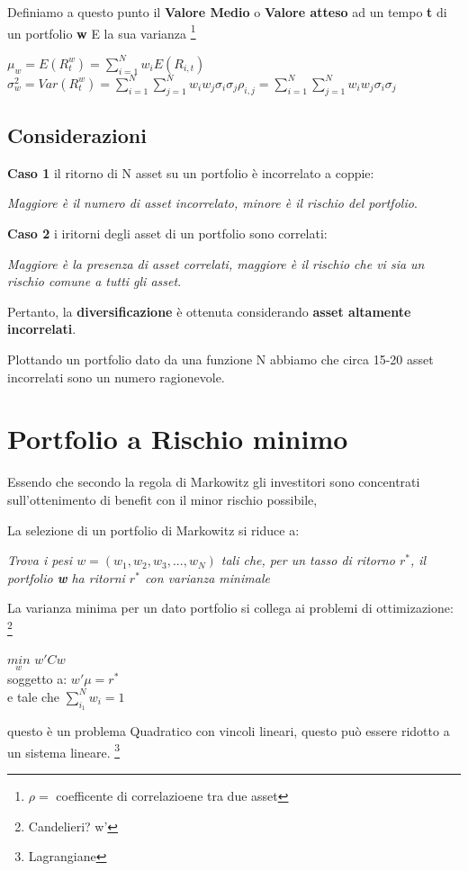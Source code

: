 \documentclass[a4paper,11pt]{report}
\begin{document}
{	Definiamo a questo punto il \textbf{Valore Medio} o \textbf{Valore atteso} ad un tempo \textbf{t} di un portfolio \textbf{w} E la sua varianza \footnote{ $\rho =$ coefficente di correlazioene tra due asset}
\begin{center}
	$\mu_w = E(R_t^w) =  \sum\limits_{i=1}^N w_i E(R_{i,t}) $ 
	$\sigma_w^2 = Var(R_t^w) =  \sum\limits_{i=1}^N  \sum\limits_{j=1}^N w_i w_j \sigma_i \sigma_j \rho_{i,j} =  \sum		\limits_{i=1}^N  \sum\limits_{j=1}^N w_i w_j \sigma_i \sigma_j  $ 
\end{center}
\subsection{Considerazioni}
	\textbf{Caso 1} il ritorno di N asset su un portfolio è incorrelato a coppie:

	\emph{Maggiore è il numero di asset incorrelato, minore è il rischio del portfolio}. 

	\textbf{Caso 2} i iritorni degli asset di un portfolio sono correlati: 

	\emph{Maggiore è la presenza di asset correlati, maggiore è il rischio che vi sia un rischio comune a tutti gli asset}. \newline

	Pertanto, la \textbf{diversificazione} è ottenuta considerando \textbf{asset altamente incorrelati}.

	Plottando un portfolio dato da una funzione N abbiamo che circa 15-20 asset incorrelati sono un numero ragionevole.

\newpage

\section{Portfolio a Rischio minimo}
	Essendo che secondo la regola di Markowitz gli investitori sono concentrati sull'ottenimento di benefit con il minor rischio 			possibile,

	La selezione di un portfolio di Markowitz si riduce a:
\begin{center}
	\emph{ Trova i pesi  $w=(w_1,w_2,w_3,...,w_N)$ tali che, per un tasso di ritorno $r^*$, il portfolio \textbf{w} ha ritorni 		$r^*$  con varianza minimale }
\end{center}
	La varianza minima per un dato portfolio si collega ai problemi di ottimizazione: \footnote{Candelieri? w'}
\begin{center}
	$ \underset{w}{min}$ $ w' Cw $ \\
	soggetto a: $ w' \mu = r^* $ \\
 	e tale che $ \sum\limits_{i_1}^{N} w_i=1 $
\end{center}
	questo è un problema Quadratico con vincoli lineari, questo può essere ridotto a un sistema lineare. \footnote{Lagrangiane}

}
\end{document}
